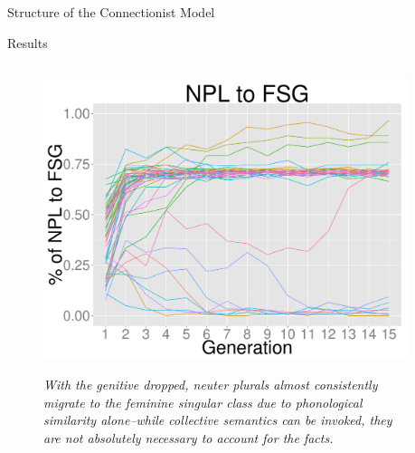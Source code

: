 \documentclass[final]{beamer}
\newlength{\twocolwid}
\begin{document}
\begin{frame}[t]
\begin{columns}[t]
\begin{column}{\twocolwid}
\begin{block}{Structure of the Connectionist Model}
\end{block}


\begin{block}{Results}

\begin{columns}[t]
      \begin{column}{.33\linewidth}
 \footnotesize
\begin{figure}
\begin{center} 
\vspace{2cm}
{\centering \includegraphics[width=1\textwidth]{npltofsg.pdf}}
\end{center}
\caption{\textit{With the genitive dropped, neuter plurals almost consistently migrate to the feminine singular class due to phonological similarity alone--while collective semantics can be invoked, they are not absolutely necessary to account for the facts.}}
\end{figure}    
      
      \end{column}
      
            \begin{column}{.33\linewidth}
            

\end{column}
\end{columns}
\end{block}
\end{column}
\end{columns}
\end{frame}
\end{document}
